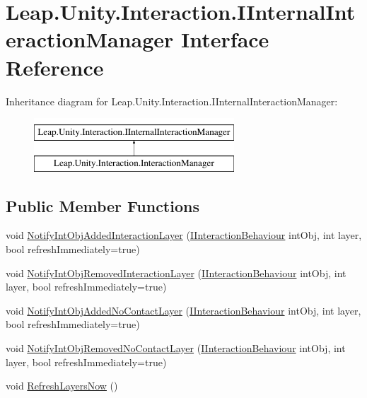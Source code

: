 \hypertarget{interface_leap_1_1_unity_1_1_interaction_1_1_i_internal_interaction_manager}{}\section{Leap.\+Unity.\+Interaction.\+I\+Internal\+Interaction\+Manager Interface Reference}
\label{interface_leap_1_1_unity_1_1_interaction_1_1_i_internal_interaction_manager}
Inheritance diagram for Leap.\+Unity.\+Interaction.\+I\+Internal\+Interaction\+Manager\+:\begin{figure}[H]
\begin{center}
\leavevmode
\includegraphics[height=2.000000cm]{interface_leap_1_1_unity_1_1_interaction_1_1_i_internal_interaction_manager}
\end{center}
\end{figure}
\subsection*{Public Member Functions}
\begin{DoxyCompactItemize}
\item 
void \mbox{\hyperlink{interface_leap_1_1_unity_1_1_interaction_1_1_i_internal_interaction_manager_a44675a6d7e276914236eb7b4ed9121b4}{Notify\+Int\+Obj\+Added\+Interaction\+Layer}} (\mbox{\hyperlink{interface_leap_1_1_unity_1_1_interaction_1_1_i_interaction_behaviour}{I\+Interaction\+Behaviour}} int\+Obj, int layer, bool refresh\+Immediately=true)
\item 
void \mbox{\hyperlink{interface_leap_1_1_unity_1_1_interaction_1_1_i_internal_interaction_manager_a23c1f9921bfbc80facc7bf1079dfa637}{Notify\+Int\+Obj\+Removed\+Interaction\+Layer}} (\mbox{\hyperlink{interface_leap_1_1_unity_1_1_interaction_1_1_i_interaction_behaviour}{I\+Interaction\+Behaviour}} int\+Obj, int layer, bool refresh\+Immediately=true)
\item 
void \mbox{\hyperlink{interface_leap_1_1_unity_1_1_interaction_1_1_i_internal_interaction_manager_a247fac548ea1f18b8813553ec14a6268}{Notify\+Int\+Obj\+Added\+No\+Contact\+Layer}} (\mbox{\hyperlink{interface_leap_1_1_unity_1_1_interaction_1_1_i_interaction_behaviour}{I\+Interaction\+Behaviour}} int\+Obj, int layer, bool refresh\+Immediately=true)
\item 
void \mbox{\hyperlink{interface_leap_1_1_unity_1_1_interaction_1_1_i_internal_interaction_manager_a20c1a9066ddfe55f67bb414425d10953}{Notify\+Int\+Obj\+Removed\+No\+Contact\+Layer}} (\mbox{\hyperlink{interface_leap_1_1_unity_1_1_interaction_1_1_i_interaction_behaviour}{I\+Interaction\+Behaviour}} int\+Obj, int layer, bool refresh\+Immediately=true)
\item 
void \mbox{\hyperlink{interface_leap_1_1_unity_1_1_interaction_1_1_i_internal_interaction_manager_aedd494f5c7653e676961a0a02de62f69}{Refresh\+Layers\+Now}} ()
\end{DoxyCompactItemize}


